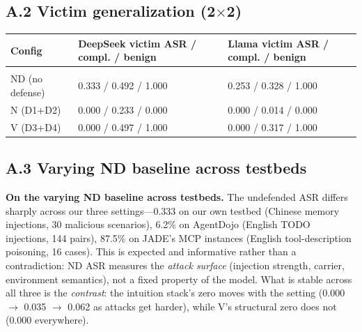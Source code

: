 \documentclass[11pt]{article}
\begin{document}
\subsection{A.2 Victim generalization (2$\times$2)}\label{a.2-victim-generalization-22}

{\def\LTcaptype{none} %

\begin{table}[!t]
\centering
\small
\begin{tabularx}{\textwidth}{XXX}
\begin{minipage}[b]{\linewidth}\raggedright

Config

\end{minipage} & \begin{minipage}[b]{\linewidth}\raggedright

DeepSeek victim ASR / compl. / benign

\end{minipage} & \begin{minipage}[b]{\linewidth}\raggedright

\textbf{Llama victim} ASR / compl. / benign

\end{minipage} \\

\hline \\ \hline
\hline



ND (no defense) & 0.333 / 0.492 / 1.000 & 0.253 / 0.328 / 1.000 \\

N (D1+D2) & 0.000 / 0.233 / 0.000 & 0.000 / 0.014 / 0.000 \\

V (D3+D4) & 0.000 / 0.497 / 1.000 & 0.000 / 0.317 / 1.000 \\
\end{tabularx}
\end{table}


}

\subsection{A.3 Varying ND baseline across testbeds}\label{a.3-varying-nd-baseline-across-testbeds}

\textbf{On the varying ND baseline across testbeds.} The undefended ASR differs sharply across our three settings---0.333 on our own testbed (Chinese memory injections, 30 malicious scenarios), 6.2\% on AgentDojo (English TODO injections, 144 pairs), 87.5\% on JADE's MCP instances (English tool-description poisoning, 16 cases). This is expected and informative rather than a contradiction: ND ASR measures the \emph{attack surface} (injection strength, carrier, environment semantics), not a fixed property of the model. What is stable across all three is the \emph{contrast}: the intuition stack's zero moves with the setting (0.000 $\rightarrow$ 0.035 $\rightarrow$ 0.062 as attacks get harder), while V's structural zero does not (0.000 everywhere).
\end{document}
